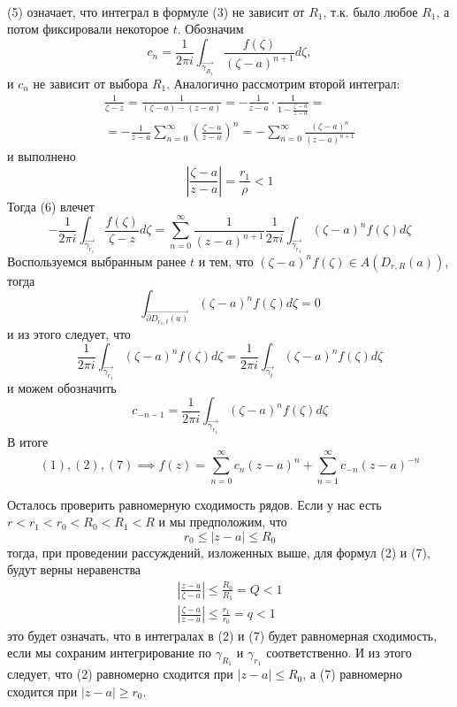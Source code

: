 \documentclass[main]{subfiles}
\begin{document}
\begin{longProof}
\begin{gather*}
    \end{gather*}
    (5) означает, что интеграл в формуле (3) не зависит от $R_1$, т.к. было любое $R_1$, а потом фиксировали некоторое $t$.
    Обозначим
    \[c_n = \frac{1}{2 \pi i}  \int_{\overrightarrow{\gamma_{R_1}}} \frac{f(\zeta)}{(\zeta -a)^{n+1}} d\zeta,\]
    и $c_n$ не зависит от выбора $R_1$.
    Аналогично рассмотрим второй интеграл:
    \begin{multline*}
        \frac{1}{\zeta - z} = \frac{1}{(\zeta - a) - (z - a)} = -\frac{1}{z - a}\cdot \frac{1}{1 - \frac{\zeta - a}{z - a}} = \\
        = -\frac{1}{z - a} \sum_{n = 0 }^{\infty} \left(\frac{\zeta - a}{z -a}\right)^n = - \sum_{n = 0 }^{\infty} \frac{(\zeta- a)^n}{(z -a)^{n+1}} \tag{6}
    \end{multline*}
    и выполнено
    \[\left| \frac{\zeta - a}{z - a} \right| = \frac{r_1}{\rho} < 1\]
    Тогда (6) влечет
    \[- \frac{1}{2 \pi i } \int_{\overrightarrow{\gamma_{r_1}}} \frac{f(\zeta)}{\zeta - z} d\zeta  = \sum_{n = 0 }^{\infty} \frac{1}{(z-a)^{n+1}} \frac{1}{2 \pi i} \int_{\overrightarrow{\gamma_{r_1}}} (\zeta - a)^n f(\zeta) d\zeta \tag{7} \]
    Воспользуемся выбранным ранее $t$ и тем, что $(\zeta - a)^n f(\zeta) \in A(D_{r, R}(a))$, тогда
    \[\int_{\overrightarrow{\partial D_{r_1, t} (a)}}  (\zeta - a)^n f(\zeta) d\zeta = 0 \tag{8}\]
    и из этого следует, что
    \[\frac{1}{2 \pi i} \int_{\overrightarrow{\gamma_{r_1}}} (\zeta - a)^n f(\zeta) d\zeta =  \frac{1}{2 \pi i}  \int_{\overrightarrow{\gamma_{t}}} (\zeta - a)^n f(\zeta) d\zeta \tag{9}\]
    и можем обозначить
    \[c_{-n-1} = \frac{1}{2 \pi i} \int_{\overrightarrow{\gamma_{r_1}}} (\zeta - a)^n f(\zeta) d\zeta\]
    В итоге
    \[(1), (2), (7) \implies f(z) = \sum_{n=0}^{\infty} c_{n} (z-a)^n + \sum_{n=1}^{\infty} c_{-n} (z-a)^{-n}\]

    Осталось проверить равномерную сходимость рядов.
    Если у нас есть $r < r_1 < r_0 < R_0 < R_1 < R$ и мы предположим, что
    \[r_0 \le |z-a| \le R_0\]
    тогда, при проведении рассуждений, изложенных выше, для формул (2) и (7), будут верны неравенства
    \begin{gather*}
        \left| \frac{z-a}{\zeta - a} \right| \le \frac{R_0}{R_1} = Q < 1\\
        \left| \frac{\zeta - a}{z - a} \right| \le \frac{r_1}{r_0} = q < 1
    \end{gather*}
    это будет означать, что в интегралах в (2) и (7) будет равномерная сходимость, если мы сохраним интегрирование по $\gamma_{R_1}$ и $\gamma_{r_1}$ соответственно.
    И из этого следует, что (2) равномерно сходится при $|z - a| \le R_0$, а (7) равномерно сходится при $|z - a| \ge r_0$.
\end{longProof}
\end{document}
